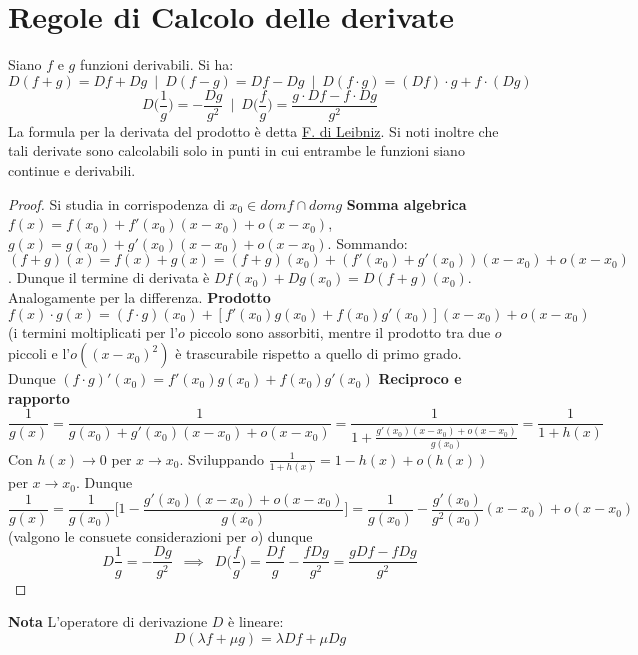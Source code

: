 \documentclass[10pt, oneside]{book}
\theoremstyle{plain}
\begin{document}
\section{Regole di Calcolo delle derivate}
\begin{prop}
Siano $f$ e $g$ funzioni derivabili. Si ha:
\[D(f + g) = Df + Dg \enspace | \enspace D(f-g) = Df - Dg \enspace | \enspace D(f \cdot g) = (Df) \cdot g + f \cdot (Dg)\] \[D \bigg(\frac{1}{g}\bigg) = - \frac{Dg}{g^2} \enspace | \enspace D \bigg(\frac{f}{g}\bigg) = \frac{g \cdot Df - f \cdot Dg}{g^2}\]
La formula per la derivata del prodotto è detta \underline{F. di Leibniz}. Si noti inoltre che tali derivate sono calcolabili solo in punti in cui entrambe le funzioni siano continue e derivabili.
\end{prop}
\begin{proof}
Si studia in corrispodenza di $x_0 \in dom f \cap dom g$
\textbf{Somma algebrica} $f(x) = f(x_0) + f'(x_0) (x-x_0) + o (x - x_0)$, $g(x) = g(x_0) + g'(x_0) (x-x_0) + o (x - x_0)$. Sommando: $(f+g)(x) = f(x) + g(x) = (f+g)(x_0) + (f'(x_0) + g'(x_0)) (x-x_0) + o (x-x_0)$. Dunque il termine di derivata è $Df(x_0) + Dg(x_0) = D(f+g)(x_0)$. Analogamente per la differenza.
\textbf{Prodotto} $f(x) \cdot g(x) = (f\cdot g)(x_0) + [f'(x_0)g(x_0) + f(x_0)g'(x_0)](x-x_0) + o(x -x_0)$ (i termini moltiplicati per l'$o$ piccolo sono assorbiti, mentre il prodotto tra due $o$ piccoli e l'$o((x-x_0)^2)$ è trascurabile rispetto a quello di primo grado. Dunque $(f\cdot g)'(x_0) = f'(x_0)g(x_0) + f(x_0)g'(x_0)$
\textbf{Reciproco e rapporto} 
\[\frac{1}{g(x)} = \frac{1}{g(x_0) + g'(x_0) (x-x_0) + o(x-x_0)} = \frac{1}{1 + \frac{g'(x_0)(x -x_0) + o(x-x_0)}{g(x_0)}} = \frac{1}{1+h(x)}\]
Con $h(x) \rightarrow 0$ per $x \rightarrow x_0$. Sviluppando $\frac{1}{1+h(x)} = 1 - h(x) + o(h(x))$ per $x \rightarrow x_0$. Dunque
\[\frac{1}{g(x)} = \frac{1}{g(x_0)}\bigg[1 - \frac{g'(x_0)(x-x_0) + o(x-x_0)}{g(x_0)} \bigg] = \frac{1}{g(x_0)} - \frac{g'(x_0)}{g^2(x_0)}(x-x_0) + o(x-x_0)\]
(valgono le consuete considerazioni per $o$) dunque
\[D\frac{1}{g} = -\frac{Dg}{g^2} \enspace \implies \enspace D\bigg(\frac{f}{g}\bigg) = \frac{Df}{g} - \frac{fDg}{g^2} = \frac{gDf - f Dg}{g^2}\]
\end{proof}

\textbf{Nota} L'operatore di derivazione $D$ è lineare:
\[D ( \lambda f + \mu g) = \lambda D f + \mu D g\]
\newpage
\end{document}
